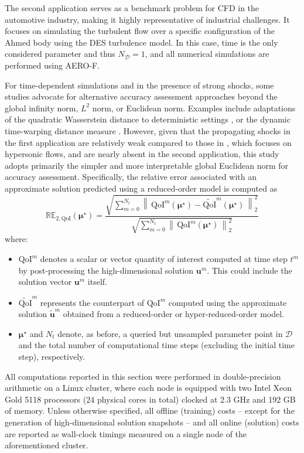 \documentclass[preprint,10pt]{elsarticle}
\begin{document}
The second application serves as a benchmark problem for CFD in the automotive industry, making it highly representative of industrial challenges. It focuses on simulating the turbulent flow over a specific configuration of the Ahmed body using the DES turbulence model. In this case, time is the only considered parameter and thus $N_\mathcal{D} = 1$, and all numerical simulations are performed using AERO-F.

For time-dependent simulations and in the presence of strong shocks, some studies \cite{chmiel2025unified} advocate for alternative accuracy assessment approaches beyond the global infinity norm, $L^2$ norm, or Euclidean norm. Examples include adaptations of the quadratic Wasserstein distance \cite{panaretos2019statistical} to deterministic settings \cite{azzi2024enhanced}, or the dynamic time-warping distance measure \cite{muller2007dynamic}. However, given that the propagating shocks in the first application are relatively weak
compared to those in \cite{chmiel2025unified}, which focuses on hypersonic flows, and are nearly absent in the second application, this study adopts primarily the simpler and more interpretable global Euclidean norm for accuracy assessment. Specifically, the relative error associated with an approximate solution predicted using a reduced-order model is 
computed as
\begin{equation}
	\label{eq:error-metric}
	\mathbb{RE}_{2, \text{QoI}}(\boldsymbol{\mu}^\star) = \frac{\sqrt{\displaystyle \sum_{m=0}^{N_t} \left\|\,\text{QoI}^m(\boldsymbol{\mu^\star}) - \widetilde{\text{QoI}}^m (\boldsymbol{\mu^\star})\,
	\right \|_2^2}} {\sqrt{\sum\limits_{m=0}^{N_t} \left \|\,\text{QoI}^m (\boldsymbol{\mu^\star})\,\right\|_2^2}}
\end{equation}
where:
\begin{itemize}
	\item $\text{QoI}^m$ denotes a scalar or vector quantity of interest computed at time step $t^m$ by post-processing the high-dimensional solution $\mathbf{u}^m$. This could include the solution vector $\mathbf{u}^m$ itself.
	\item $\widetilde{\text{QoI}}^m$ represents the counterpart of $\text{QoI}^m$ computed using the approximate solution $\tilde{\mathbf{u}}^m$ obtained from a reduced-order or hyper-reduced-order model.
	\item $\boldsymbol{\mu}^\star$ and $N_t$ denote, as before, a queried but unsampled parameter point in $\mathcal{D}$ and the total number of computational time steps (excluding the initial time step), respectively.
\end{itemize}
All computations reported in this section were performed in double-precision arithmetic on a Linux cluster, where each node is equipped with two Intel Xeon Gold 5118 processors (24 physical cores in total) clocked at 2.3 GHz and 192 GB of memory. Unless otherwise specified, all offline (training) costs -- except for the generation of high-dimensional solution snapshots -- and all online (solution) costs are reported as wall-clock timings measured on a single node of the aforementioned cluster.
\end{document}
